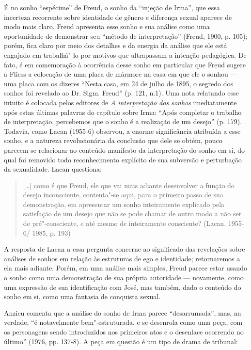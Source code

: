 É no sonho ``espécime'' de Freud, o sonho da ``injeção de Irma'', que
essa incerteza recorrente sobre identidade de gênero e diferença sexual
aparece de modo mais claro. Freud apresenta esse sonho e sua análise
como uma oportunidade de demonstrar seu ``método de interpretação''
(Freud, 1900, p. 105); porém, fica claro por meio dos detalhes e da
energia da análise que ele está engajado em trabalhá"-lo por motivos que
ultrapassam a intenção pedagógica. De fato, é em comemoração à
ocorrência desse sonho em particular que Freud sugere a Fliess a
colocação de uma placa de mármore na casa em que ele o sonhou --- uma
placa com os dizeres ``Nesta casa, em 24 de julho de 1895, o segredo dos
sonhos foi revelado ao Dr. Sigm. Freud'' (p. 121, n.1). Uma nota
relatando esse intuito é colocada pelos editores de \emph{A
interpretação dos sonhos} imediatamente após estas últimas palavras do
capítulo sobre Irma: ``Após completar o trabalho de interpretação,
percebemos que o sonho é a realização de um desejo'' (p. 179). Todavia,
como Lacan (1955-6) observou, a enorme significância atribuída a esse
sonho, e a natureza revolucionária da conclusão que dele se obtém, pouco
parecem se relacionar ao conteúdo manifesto da interpretação do sonho em
si, do qual foi removido todo reconhecimento explícito de sua subversão
e perturbação da sexualidade. Lacan questiona:

\begin{quote}
{[}\ldots{}{]} como é que Freud, ele que vai mais adiante desenvolver a
função do desejo inconsciente, contenta"-se aqui, para o primeiro passo
de sua demonstração, em apresentar um sonho inteiramente explicado pela
satisfação de um desejo que não se pode chamar de outro modo a não ser
de pré"-consciente, e até mesmo de inteiramente consciente? (Lacan,
1955-6/ 1985, p. 193)
\end{quote}

A resposta de Lacan a essa pergunta concerne ao significado das
revelações sobre análises de sonhos em relação às estruturas de ego e
identidade; retornaremos a ela mais adiante. Porém, em uma análise mais
simples, Freud parece estar usando o sonho como uma demonstração de sua
própria autoridade --- novamente, como uma expressão de sua identificação
com José, mas também, dado o conteúdo do sonho em si, como uma fantasia
de conquista sexual.

Anzieu comenta que a análise do sonho de Irma parece ``desarrumada'',
mas, na verdade, ``é notavelmente bem"-estruturada, e se desenrola como
uma peça, com os personagens sendo introduzidos nos primeiros atos e o
desenlace ocorrendo no último'' (1976, pp. 137-8). A peça em questão é
um tipo de drama de tribunal:

